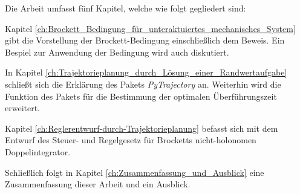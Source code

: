 Die Arbeit umfasst fünf Kapitel, welche wie folgt gegliedert sind:

Kapitel \ref{ch:Brockett_Bedingung_für_unteraktuiertes_mechanisches_System} gibt die Vorstellung der Brockett-Bedingung einschließlich dem Beweis. Ein Bespiel zur Anwendung der Bedingung wird auch diskutiert.

In Kapitel \ref{ch:Trajektorieplanung_durch_Lösung_einer_Randwertaufgabe} schließt sich die Erklärung des Pakets \emph{PyTrajectory} an. Weiterhin wird die Funktion des Pakets für die Bestimmung der optimalen Überführungszeit erweitert.

Kapitel \ref{ch:Reglerentwurf-durch-Trajektorieplanung} befasst sich mit dem Entwurf des Steuer- und Regelgesetz für Brocketts nicht-holonomen Doppelintegrator.

Schließlich folgt in Kapitel \ref{ch:Zusammenfassung_und_Ausblick} eine Zusammenfassung dieser Arbeit und ein Ausblick.